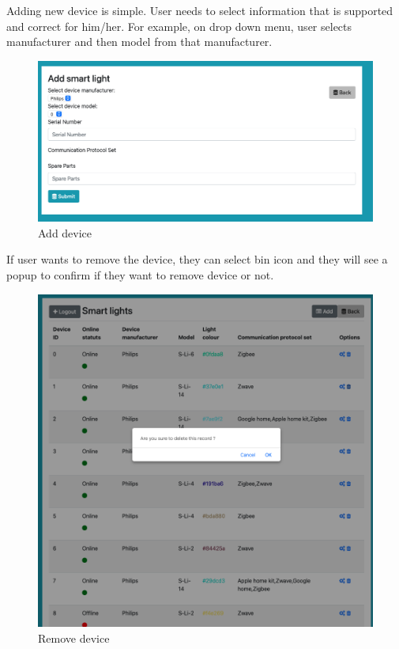 Adding new device is simple. User needs to select information that is supported and correct for him/her. For example, on drop down menu, user selects manufacturer and then model from that manufacturer.
\begin{figure}[H]
\includegraphics[scale=0.4]{img/addDevice.jpeg}
\centering
\caption{Add device}
\end{figure}

If user wants to remove the device, they can select bin icon and they will see a popup to confirm if they want to remove device or not.
\begin{figure}[H]
\includegraphics[scale=0.4]{img/removeDevice.jpeg}
\centering
\caption{Remove device}
\end{figure}

